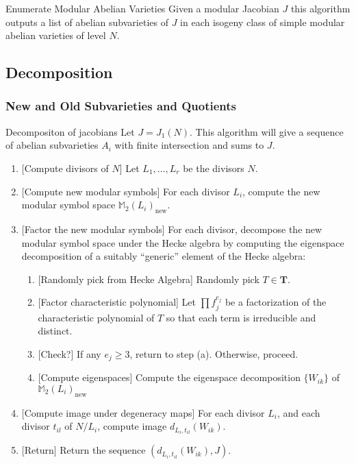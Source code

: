 \documentclass{article}
\begin{document}
\begin{algorithm}{Enumerate Modular Abelian Varieties}
  Given a modular Jacobian $J$ this algorithm outputs a list of
  abelian subvarieties of $J$ in each isogeny class of simple modular
  abelian varieties of level $N$.
\end{algorithm}


\subsection{Decomposition}
\subsubsection{New and Old Subvarieties and Quotients}


\begin{algorithm}{Decompositon of jacobians}
    \label{decomp_jacobian}
    Let $J=J_1(N)$. This algorithm will give a sequence of abelian subvarieties
    $A_i$ with finite intersection and sums to $J$.
\begin{enumerate}
    \item{} [Compute divisors of $N$]
        Let $L_1,\ldots, L_r$ be the divisors $N$.
    \item{} [Compute new modular symbols]
        For each divisor $L_i$, compute the new modular symbol space
        $\mathbb{M}_2(L_i)_\mathrm{new}$.
    \item{} [Factor the new modular symbols]
        For each divisor, decompose the new modular symbol space under the
        Hecke algebra by computing the eigenspace decomposition of a suitably
        ``generic'' element of the Hecke algebra:
        \begin{enumerate}
            \item{} [Randomly pick from Hecke Algebra]
                Randomly pick $T\in \mathbf{T}$.
            \item{} [Factor characteristic polynomial]
                Let $\prod f_j ^{e_j}$ be a factorization of the characteristic
                polynomial of $T$ so that each term is irreducible and
                distinct.
            \item{} [Check?]
                If any $e_j \geq 3$, return to step (a). Otherwise, proceed.
            \item{} [Compute eigenspaces]
                Compute the eigenspace decomposition $\{W_{ik}\}$ of
                $\mathbb{M}_2(L_i)_\mathrm{new}$
        \end{enumerate}
    \item{} [Compute image under degeneracy maps]
        For each divisor $L_i$, and each divisor $t_{il}$ of $N/L_i$, compute
        image $d_{L_i, t_{il}}(W_{ik})$.
    \item{} [Return]
        Return the sequence $(d_{L_i, t_{il}}(W_{ik}), J)$.
\end{enumerate}

    
\end{algorithm}
\end{document}

